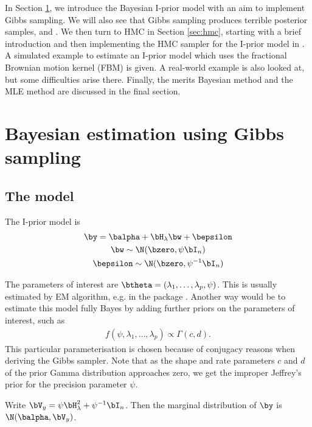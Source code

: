 \documentclass[english, 11pt]{article}
\begin{document}
In Section \ref{sec:gibbs}, we introduce the Bayesian I-prior model with an aim to implement Gibbs sampling. 
We will also see that Gibbs sampling produces terrible posterior samples, and .
We then turn to HMC in Section \ref{sec:hmc}, starting with a brief introduction and then implementing the HMC sampler for the I-prior model in .
A simulated example to estimate an I-prior model which uses the fractional Brownian motion kernel (FBM) is given.
A real-world example is also looked at, but some difficulties arise there.
Finally, the merits Bayesian method and the MLE method are discussed in the final section.



\section{Bayesian estimation using Gibbs sampling}
\label{sec:gibbs}

\subsection{The model}

The I-prior model is
\begin{align}\label{eq:iprior}
\begin{gathered}
	\by = \balpha + \Hlam\bw + \bepsilon \\
	\bw \sim \N (\bzero, \psi\bI_n) \\
	\bepsilon \sim \N (\bzero, \psi^{-1}\bI_n)
\end{gathered}
\end{align}

The parameters of interest are $\btheta = (\lambda_1, \dots, \lambda_p, \psi)$. This is usually estimated by EM algorithm, e.g. in the  package \citep{jamil2017}. Another way would be to estimate this model fully Bayes by adding further priors on the parameters of interest, such as
\begin{align}\label{eq:hyperpriors}
	f(\psi, \lambda_1, \dots, \lambda_p) \propto \Gamma(c,d).
\end{align}
This particular parameterisation is chosen because of conjugacy reasons when deriving the Gibbs sampler. Note that as the shape and rate parameters $c$ and $d$ of the prior Gamma distribution approaches zero, we get the improper Jeffrey's prior for the precision parameter $\psi$.

Write $\Vy = \psi\Hlam^2 + \psi^{-1}\bI_n$.
Then the marginal distribution of $\by$ is $\N (\balpha, \Vy)$.
\end{document}
